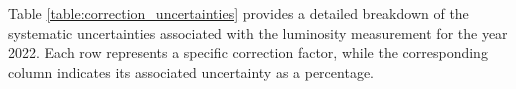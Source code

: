 \begin{itemize}





\end{itemize}

Table \ref{table:correction_uncertainties} provides a detailed breakdown of the systematic uncertainties associated with the luminosity measurement for the year 2022. Each row represents a specific correction factor, while the corresponding column indicates its associated uncertainty as a percentage. 

